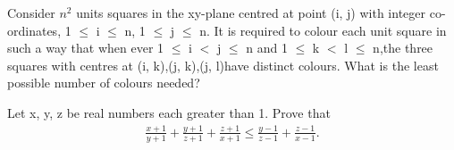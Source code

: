 \item Consider $n^{2}$ units squares in the xy-plane centred at point (i, j) with integer co-ordinates, 
1 $\leq$ i $\leq$ n, 1 $\leq$ j $\leq$ n. It is required to colour each unit square in such a way that when ever 
1 $\leq$ i $<$ j $\leq$ n and 1 $\leq$ k $<$ l $\leq$ n,the three squares with centres at (i, k),(j, k),(j, l)have distinct colours. What is the least possible number of colours needed?

\item Let x, y, z be real numbers each greater than 1. Prove that 
\begin{align*}
\frac{x+1}{y+1} + \frac{y+1}{z+1} + \frac{z+1}{x+1} \leq \frac{y-1}{z-1} + \frac{z-1}{x-1}.
\end{align*}
